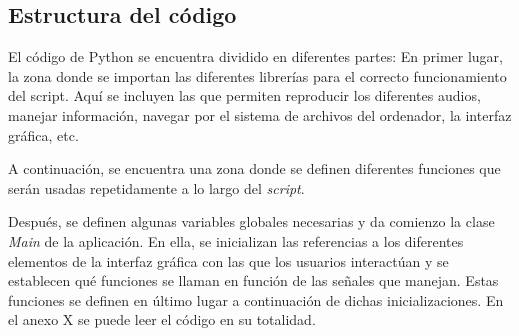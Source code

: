 \documentclass[11pt,a4paper,twoside]{book}
\begin{document}
            \subsection{Estructura del código}
                El código de Python se encuentra dividido en diferentes partes:
                En primer lugar, la zona donde se importan las diferentes librerías para el correcto funcionamiento del script. Aquí se incluyen las que permiten reproducir los diferentes audios, manejar información, navegar por el sistema de archivos del ordenador, la interfaz gráfica, etc.
                
                A continuación, se encuentra una zona donde se definen diferentes funciones que serán usadas repetidamente a lo largo del \textit{script}. 
                
                Después, se definen algunas variables globales necesarias y da comienzo la clase \textit{Main} de la aplicación. En ella, se inicializan las referencias a los diferentes elementos de la interfaz gráfica con las que los usuarios interactúan y se establecen qué funciones se llaman en función de las señales que manejan. Estas funciones se definen en último lugar a continuación de dichas inicializaciones. En el anexo X se puede leer el código en su totalidad.
               
        


\end{document}
